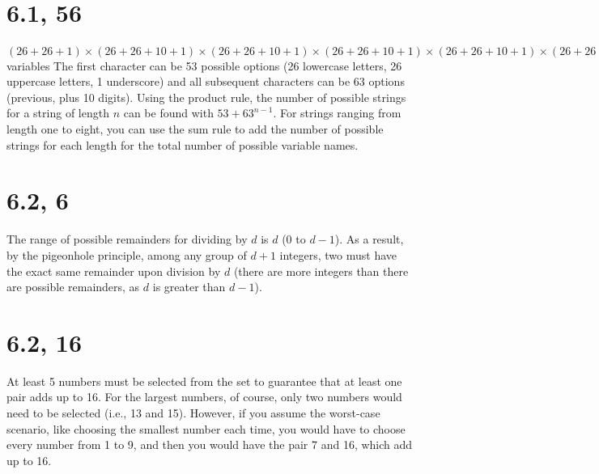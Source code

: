 \documentclass{article}
\begin{document}
\section{6.1, 56}
$(26 + 26 + 1) \times (26 + 26 + 10 + 1) \times (26 + 26 + 10 + 1) \times (26 + 26 + 10 + 1) \times (26 + 26 + 10 + 1) \times (26 + 26 + 10 + 1) \times (26 + 26 + 10 + 1) \times (26 + 26 + 10 + 1) + (26 + 26 + 1) \times (26 + 26 + 10 + 1) \times (26 + 26 + 10 + 1) \times (26 + 26 + 10 + 1) \times (26 + 26 + 10 + 1) \times (26 + 26 + 10 + 1) \times (26 + 26 + 10 + 1) + (26 + 26 + 1) \times (26 + 26 + 10 + 1) \times (26 + 26 + 10 + 1) \times (26 + 26 + 10 + 1) \times (26 + 26 + 10 + 1) \times (26 + 26 + 10 + 1) + (26 + 26 + 1) \times (26 + 26 + 10 + 1) \times (26 + 26 + 10 + 1) \times (26 + 26 + 10 + 1) \times (26 + 26 + 10 + 1) + (26 + 26 + 1) \times (26 + 26 + 10 + 1) \times (26 + 26 + 10 + 1) \times (26 + 26 + 10 + 1) + (26 + 26 + 1) \times (26 + 26 + 10 + 1) \times (26 + 26 + 10 + 1) + (26 + 26 + 1) \times (26 + 26 + 10 + 1) + (26 + 26 + 1) = 2.12132159 \times 10^{14}$ variables
\newline
The first character can be 53 possible options (26 lowercase letters, 26 uppercase letters, 1 underscore) and all subsequent characters can be 63 options (previous, plus 10 digits). Using the product rule, the number of possible strings for a string of length $n$ can be found with $53 + 63^{n - 1}$. For strings ranging from length one to eight, you can use the sum rule to add the number of possible strings for each length for the total number of possible variable names.

\section{6.2, 6}
The range of possible remainders for dividing by $d$ is $d$ (0 to $d - 1$). As a result, by the pigeonhole principle, among any group of $d + 1$ integers, two must have the exact same remainder upon division by $d$ (there are more integers than there are possible remainders, as $d$ is greater than $d - 1$).

\section{6.2, 16}
At least 5 numbers must be selected from the set to guarantee that at least one pair adds up to 16. For the largest numbers, of course, only two numbers would need to be selected (i.e., 13 and 15). However, if you assume the worst-case scenario, like choosing the smallest number each time, you would have to choose every number from 1 to 9, and then you would have the pair 7 and 16, which add up to 16.
\end{document}
